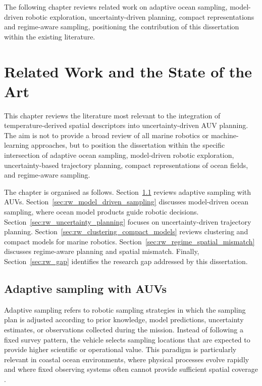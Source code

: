 The following chapter reviews related work on adaptive ocean sampling, model-driven robotic exploration, uncertainty-driven planning, compact representations and regime-aware sampling, positioning the contribution of this dissertation within the existing literature.



\chapter{Related Work and the State of the Art} \label{chap:related_work}

This chapter reviews the literature most relevant to the integration of temperature-derived spatial descriptors into uncertainty-driven AUV planning. The aim is not to provide a broad review of all marine robotics or machine-learning approaches, but to position the dissertation within the specific intersection of adaptive ocean sampling, model-driven robotic exploration, uncertainty-based trajectory planning, compact representations of ocean fields, and regime-aware sampling.

The chapter is organised as follows. Section~\ref{sec:rw_adaptive_sampling_auvs} reviews adaptive sampling with AUVs. Section~\ref{sec:rw_model_driven_sampling} discusses model-driven ocean sampling, where ocean model products guide robotic decisions. Section~\ref{sec:rw_uncertainty_planning} focuses on uncertainty-driven trajectory planning. Section~\ref{sec:rw_clustering_compact_models} reviews clustering and compact models for marine robotics. Section~\ref{sec:rw_regime_spatial_mismatch} discusses regime-aware planning and spatial mismatch. Finally, Section~\ref{sec:rw_gap} identifies the research gap addressed by this dissertation.

\section{Adaptive sampling with AUVs} \label{sec:rw_adaptive_sampling_auvs}

Adaptive sampling refers to robotic sampling strategies in which the sampling plan is adjusted according to prior knowledge, model predictions, uncertainty estimates, or observations collected during the mission. Instead of following a fixed survey pattern, the vehicle selects sampling locations that are expected to provide higher scientific or operational value. This paradigm is particularly relevant in coastal ocean environments, where physical processes evolve rapidly and where fixed observing systems often cannot provide sufficient spatial coverage \parencite{hwang2019auvreview,lermusiaux2007adaptive}.

